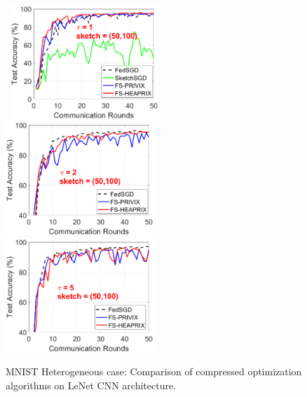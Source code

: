 \documentclass[twoside]{article}
\begin{document}
\begin{figure}[H]
\begin{center}
		\mbox{\hspace{-0.15in}	
		\includegraphics[width=2.2in]{MNIST_figures/local1_sketch50_iid0_test_acc.eps} \hspace{-0.15in}
		\includegraphics[width=2.2in]{MNIST_figures/local2_sketch50_iid0_test_acc.eps} \hspace{-0.15in}
		\includegraphics[width=2.2in]{MNIST_figures/local5_sketch50_iid0_test_acc.eps}
		}
	\end{center}
	\caption{MNIST Heterogeneous case: Comparison of compressed optimization algorithms on LeNet CNN architecture.}
    \label{fig:MNIST-iid0-app}
\end{figure}
\end{document}

